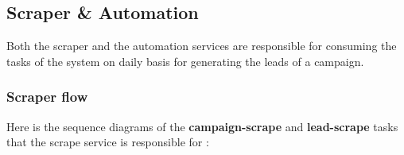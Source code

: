 \subsection{Scraper \& Automation}
Both the scraper and the automation services are responsible for consuming the tasks of the system on daily basis for generating the leads of a campaign.
\subsubsection{Scraper flow}
Here is the sequence diagrams of the \textbf{campaign-scrape} and \textbf{lead-scrape} tasks that the scrape service is responsible for :
\linebreak
{}
\newpage
